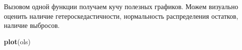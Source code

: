 \documentclass[]{book}
\newenvironment{Shaded}{\begin{snugshade}}{\end{snugshade}}
\newcommand{\KeywordTok}[1]{\textcolor[rgb]{0.13,0.29,0.53}{\textbf{#1}}}
\newcommand{\NormalTok}[1]{#1}
\begin{document}
Вызовом одной функции получаем кучу полезных графиков. Можем визуально оценить наличие гетероскедастичности, нормальность распределения остатков, наличие выбросов.

\begin{Shaded}
\begin{Highlighting}[]
\KeywordTok{plot}\NormalTok{(ols)}
\end{Highlighting}
\end{Shaded}

\
\end{document}
